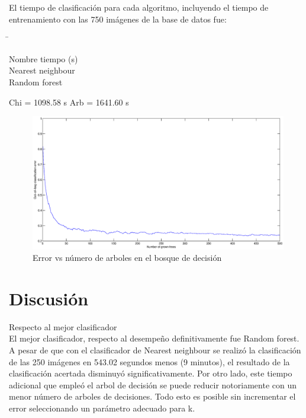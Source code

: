 \documentclass[10pt,twocolumn,letterpaper]{article}
\begin{document}
El tiempo de clasificación para cada algoritmo, incluyendo el tiempo de entrenamiento con las 750 imágenes de la base de datos fue:

\begin{tabbing}
\hspace*{3cm} \= \hspace*{3cm}\kill

Nombre \> tiempo (s) \\
Nearest neighbour  \\
Random forest  \\

\end{tabbing}


Chi = 1098.58 s
Arb = 1641.60 s


\begin{figure}[t]
\begin{center}
   \includegraphics[width=1\linewidth]{arbolerror.eps}
\end{center}
   \caption{Error vs número de arboles en el bosque de decisión}
\label{fig:seg}
\end{figure}

\section{Discusión}

Respecto al mejor clasificador\\

El mejor clasificador, respecto al desempeño definitivamente fue Random forest. A pesar de que con el clasificador de Nearest neighbour se realizó la clasificación de las 250 imágenes en 543.02 segundos menos (9 minutos), el resultado de la clasificación acertada disminuyó significativamente. Por otro lado, este tiempo adicional que empleó el arbol de decisión se puede reducir notoriamente con un menor número de arboles de decisiones. Todo esto es posible sin incrementar el error seleccionando un parámetro adecuado para k.
\end{document}
